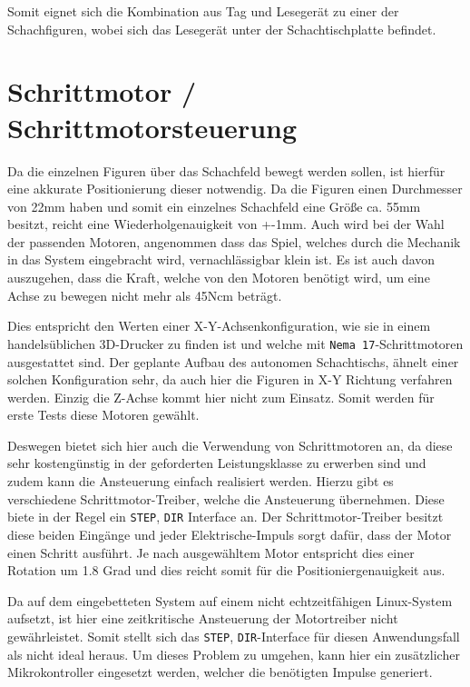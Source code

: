 Somit eignet sich die Kombination aus Tag und Lesegerät zu einer der
Schachfiguren, wobei sich das Lesegerät unter der Schachtischplatte
befindet.

\hypertarget{schrittmotor-schrittmotorsteuerung}{%
\section{Schrittmotor /
Schrittmotorsteuerung}\label{schrittmotor-schrittmotorsteuerung}}

Da die einzelnen Figuren über das Schachfeld bewegt werden sollen, ist
hierfür eine akkurate Positionierung dieser notwendig. Da die Figuren
einen Durchmesser von 22mm haben und somit ein einzelnes Schachfeld eine
Größe ca. 55mm besitzt, reicht eine Wiederholgenauigkeit von +-1mm. Auch
wird bei der Wahl der passenden Motoren, angenommen dass das Spiel,
welches durch die Mechanik in das System eingebracht wird,
vernachlässigbar klein ist. Es ist auch davon auszugehen, dass die
Kraft, welche von den Motoren benötigt wird, um eine Achse zu bewegen
nicht mehr als 45Ncm beträgt.

Dies entspricht den Werten einer X-Y-Achsenkonfiguration, wie sie in
einem handelsüblichen 3D-Drucker zu finden ist und welche mit
\passthrough{\lstinline!Nema 17!}-Schrittmotoren ausgestattet sind. Der
geplante Aufbau des autonomen Schachtischs, ähnelt einer solchen
Konfiguration sehr, da auch hier die Figuren in X-Y Richtung verfahren
werden. Einzig die Z-Achse kommt hier nicht zum Einsatz. Somit werden
für erste Tests diese Motoren gewählt.

Deswegen bietet sich hier auch die Verwendung von Schrittmotoren an, da
diese sehr kostengünstig in der geforderten Leistungsklasse zu erwerben
sind und zudem kann die Ansteuerung einfach realisiert werden. Hierzu
gibt es verschiedene Schrittmotor-Treiber, welche die Ansteuerung
übernehmen. Diese biete in der Regel ein \passthrough{\lstinline!STEP!},
\passthrough{\lstinline!DIR!} Interface an. Der Schrittmotor-Treiber
besitzt diese beiden Eingänge und jeder Elektrische-Impuls sorgt dafür,
dass der Motor einen Schritt ausführt. Je nach ausgewähltem Motor
entspricht dies einer Rotation um 1.8 Grad und dies reicht somit für die
Positioniergenauigkeit aus.

Da auf dem eingebetteten System auf einem nicht echtzeitfähigen
Linux-System aufsetzt, ist hier eine zeitkritische Ansteuerung der
Motortreiber nicht gewährleistet. Somit stellt sich das
\passthrough{\lstinline!STEP!}, \passthrough{\lstinline!DIR!}-Interface
für diesen Anwendungsfall als nicht ideal heraus. Um dieses Problem zu
umgehen, kann hier ein zusätzlicher Mikrokontroller eingesetzt werden,
welcher die benötigten Impulse generiert.

